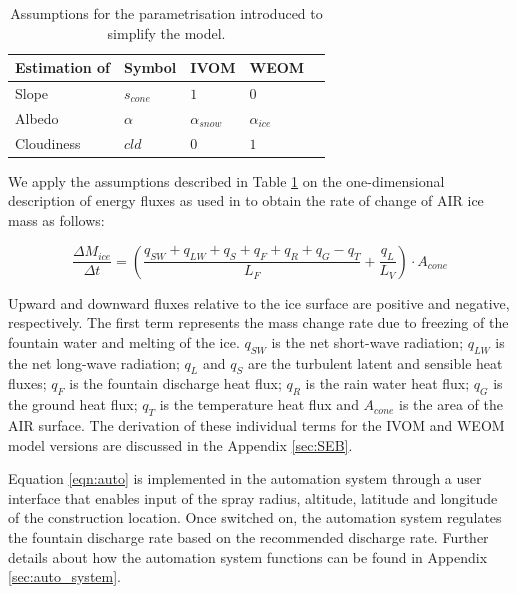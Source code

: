\documentclass[tc, manuscript]{copernicus}
\begin{document}
\begin{table}[]
\centering
\caption{Assumptions for the parametrisation introduced to simplify the model.}
\label{tab:assumptions}
\begin{tabular}{@{}lllll@{}}
\toprule
\textbf{Estimation of} & \textbf{Symbol} & \textbf{IVOM} & \textbf{WEOM} & \\ \midrule
\multicolumn{1}{|l}{Slope}        & $s_{cone}$ & $ 1 $ & $0$ & \multicolumn{1}{l|}{} \\ \midrule
\multicolumn{1}{|l}{Albedo} & $\alpha$ & $\alpha_{snow}$ & $\alpha_{ice}$ & \multicolumn{1}{l|}{} \\\midrule 
\multicolumn{1}{|l}{Cloudiness}  & $cld$ & $0$ & $1$ & \multicolumn{1}{l|}{} \\ \bottomrule
\end{tabular}
\end{table}

We apply the assumptions described in Table \ref{tab:assumptions} on the one-dimensional description of energy
fluxes as used in \cite{balasubramanianInfluenceMeteorologicalConditions2022} to obtain the rate of change of
AIR ice mass as follows: 

\begin{equation}
  \frac{\Delta M_{ice}}{\Delta t}  =  (\frac{q_{SW} + q_{LW} + q_{S} + q_{F} + q_{R} + q_{G} - q_{T}}{L_F} + \frac{q_{L}}{L_V} ) \cdot A_{cone}
	\label{eqn:auto}
\end{equation}

Upward and downward fluxes relative to the ice surface are positive and negative, respectively. The first term
represents the mass change rate due to freezing of the fountain water and melting of the ice. $q_{SW}$ is the
net short-wave radiation; $q_{LW}$ is the net long-wave radiation; $q_{L}$ and $q_{S}$ are the turbulent latent
and sensible heat fluxes; $q_{F}$ is the fountain discharge heat flux; $q_{R}$ is the rain water heat flux;
$q_{G}$ is the ground heat flux; $q_{T}$ is the temperature heat flux and $A_{cone}$ is the area of the AIR
surface. The derivation of these individual terms for the IVOM and WEOM model versions are discussed in the
Appendix \ref{sec:SEB}.

Equation \ref{eqn:auto} is implemented in the automation system through a user interface that enables input of
the spray radius, altitude, latitude and longitude of the construction location. Once switched on, the
automation system regulates the fountain discharge rate based on the recommended discharge rate. Further details
about how the automation system functions can be found in Appendix \ref{sec:auto_system}. 
\end{document}
